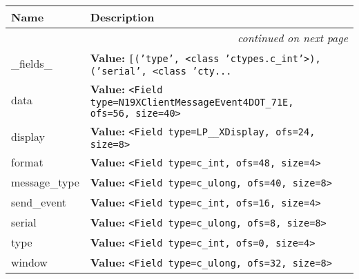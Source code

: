     \vspace{-1cm}
\hspace{\varindent}\begin{longtable}{|p{\varnamewidth}|p{\vardescrwidth}|l}
\cline{1-2}
\cline{1-2} \centering \textbf{Name} & \centering \textbf{Description}& \\
\cline{1-2}
\endhead\cline{1-2}\multicolumn{3}{r}{\small\textit{continued on next page}}\\\endfoot\cline{1-2}
\endlastfoot\raggedright \_\-f\-i\-e\-l\-d\-s\-\_\- & \raggedright \textbf{Value:} 
{\tt \texttt{[}\texttt{(}\texttt{'}\texttt{type}\texttt{'}\texttt{, }{\textless}class 'ctypes.c\_int'{\textgreater}\texttt{)}\texttt{, }\texttt{(}\texttt{'}\texttt{serial}\texttt{'}\texttt{, }{\textless}class 'cty\texttt{...}}&\\
\cline{1-2}
\raggedright d\-a\-t\-a\- & \raggedright \textbf{Value:} 
{\tt {\textless}Field type=N19XClientMessageEvent4DOT\_71E, ofs=56, size=40{\textgreater}}&\\
\cline{1-2}
\raggedright d\-i\-s\-p\-l\-a\-y\- & \raggedright \textbf{Value:} 
{\tt {\textless}Field type=LP\_\_XDisplay, ofs=24, size=8{\textgreater}}&\\
\cline{1-2}
\raggedright f\-o\-r\-m\-a\-t\- & \raggedright \textbf{Value:} 
{\tt {\textless}Field type=c\_int, ofs=48, size=4{\textgreater}}&\\
\cline{1-2}
\raggedright m\-e\-s\-s\-a\-g\-e\-\_\-t\-y\-p\-e\- & \raggedright \textbf{Value:} 
{\tt {\textless}Field type=c\_ulong, ofs=40, size=8{\textgreater}}&\\
\cline{1-2}
\raggedright s\-e\-n\-d\-\_\-e\-v\-e\-n\-t\- & \raggedright \textbf{Value:} 
{\tt {\textless}Field type=c\_int, ofs=16, size=4{\textgreater}}&\\
\cline{1-2}
\raggedright s\-e\-r\-i\-a\-l\- & \raggedright \textbf{Value:} 
{\tt {\textless}Field type=c\_ulong, ofs=8, size=8{\textgreater}}&\\
\cline{1-2}
\raggedright t\-y\-p\-e\- & \raggedright \textbf{Value:} 
{\tt {\textless}Field type=c\_int, ofs=0, size=4{\textgreater}}&\\
\cline{1-2}
\raggedright w\-i\-n\-d\-o\-w\- & \raggedright \textbf{Value:} 
{\tt {\textless}Field type=c\_ulong, ofs=32, size=8{\textgreater}}&\\
\cline{1-2}
\end{longtable}


